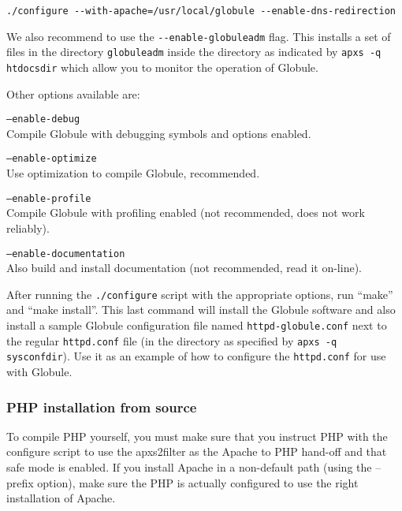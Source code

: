 \documentclass[10pt,a4paper]{article}
\makeatletter
\newenvironment{p}{\@open{P}{}}{\@close{P}}
\newenvironment{p}{}{\par}
\makeatother
\begin{document}
\begin{Verbatim}
./configure --with-apache=/usr/local/globule --enable-dns-redirection
\end{Verbatim}

\begin{p}
We also recommend to use the \verb!--enable-globuleadm!
flag.  This installs a set of files in the directory \texttt{globuleadm}
inside the directory as indicated by \texttt{apxs -q htdocsdir} which allow
you to monitor the operation of Globule.
\end{p}

\begin{p}
Other options available are:
\begin{description}
\item{\texttt{--enable-debug}} \\
  Compile Globule with debugging symbols and options enabled.
\item{\texttt{--enable-optimize}} \\
  Use optimization to compile Globule, recommended.
\item{\texttt{--enable-profile}} \\
  Compile Globule with profiling enabled (not recommended, does not work
  reliably).
\item{\texttt{--enable-documentation}} \\
  Also build and install documentation (not recommended, read it on-line).
\end{description}
\end{p}

\begin{p}
After running the \texttt{./configure} script with the appropriate options,
run ``make'' and ``make install''.  This last command will install the Globule
software and also install a sample Globule configuration file named
\texttt{httpd-globule.conf} next to the regular \verb!httpd.conf! file (in the
directory as specified by \texttt{apxs -q sysconfdir}).  Use it as an example
of how to configure the \verb!httpd.conf! for use with Globule.
\end{p}

\subsubsection{PHP installation from source}

\begin{p}
To compile PHP yourself, you must make sure that you instruct PHP with the
configure script to use the apxs2filter as the Apache to PHP hand-off and that
safe mode is enabled.  If you install Apache in a non-default path (using the
--prefix option), make sure the PHP is actually configured to use the right
installation of Apache.
\end{p}
\end{document}
